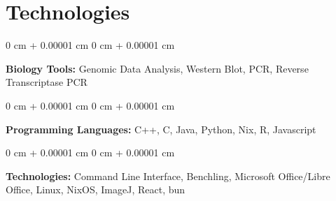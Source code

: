 \documentclass[10pt, article]{article}
\newenvironment{onecolentry}{
    \begin{adjustwidth}{
        0 cm + 0.00001 cm
    }{
        0 cm + 0.00001 cm
    }
}{
    \end{adjustwidth}
} %
\begin{document}
    \section{Technologies}



        \begin{onecolentry}
            {\textbf{Biology Tools:}} Genomic Data Analysis, Western Blot, PCR, Reverse Transcriptase PCR
        \end{onecolentry}
        \vspace{0.2 cm}
        \begin{onecolentry}
            \textbf{Programming Languages:} C++, C, Java, Python, Nix, R, Javascript
        \end{onecolentry}

        \vspace{0.2 cm}

        \begin{onecolentry}
            \textbf{Technologies:} Command Line Interface, Benchling, Microsoft Office/Libre Office, Linux, NixOS, ImageJ, React, bun
        \end{onecolentry}
     
\end{document}
